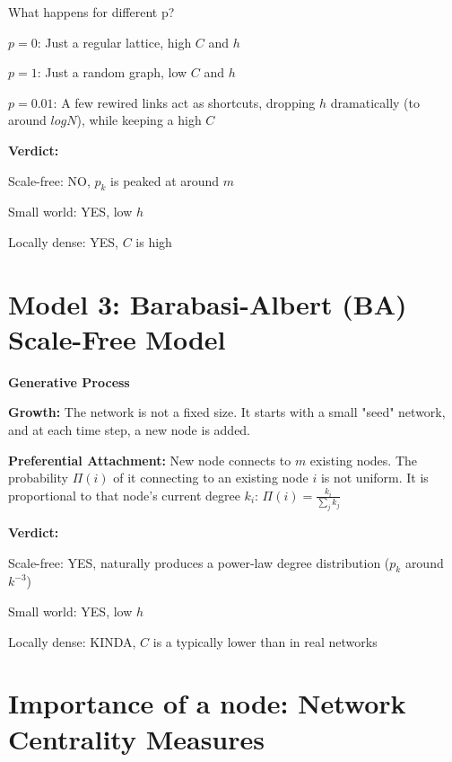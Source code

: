 What happens for different p?
\begin{tightitemize}
    \item $p = 0$: Just a regular lattice, high $C$ and $h$
    \item $p = 1$: Just a random graph, low $C$ and $h$
    \item $p = 0.01$: A few rewired links act as shortcuts, dropping 
    $h$ dramatically (to around $log N$), while keeping a high $C$
\end{tightitemize}

\textbf{Verdict:}
\begin{tightitemize}
    \item Scale-free: NO, $p_k$ is peaked at around $m$
    \item Small world: YES, low $h$
    \item Locally dense: YES, $C$ is high 
\end{tightitemize}

\section*{Model 3: Barabasi-Albert (BA) Scale-Free Model}

\textbf{Generative Process}

\begin{tightitemize}
    \item \textbf{Growth:} The network is not a fixed size. It starts with a small "seed" 
    network, and at each time step, a new node is added.
    \item \textbf{Preferential Attachment:} New node connects to $m$ existing nodes. 
    The probability $\Pi(i)$ of it connecting to an existing node $i$ is not uniform. 
    It is proportional to that node's current degree $k_i$:
    $
    \Pi(i) = \frac{k_i}{\sum_{j}k_j}
    $
\end{tightitemize}

\textbf{Verdict:}
\begin{tightitemize}
    \item Scale-free: YES, naturally produces a power-law degree distribution ($p_k$ around $k^{-3}$)
    \item Small world: YES, low $h$
    \item Locally dense: KINDA, $C$ is a typically lower than in real networks
\end{tightitemize}

\section*{Importance of a node: Network Centrality Measures}

